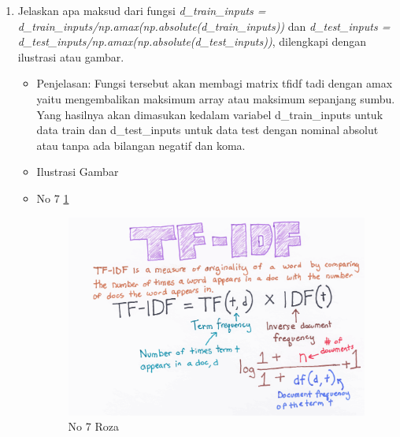 \begin{enumerate}
\item Jelaskan apa maksud dari fungsi \emph{d\_train\_inputs = d\_train\_inputs/np.amax(np.absolute(d\_train\_inputs))} dan \emph{d\_test\_inputs = d\_test\_inputs/np.amax(np.absolute(d\_test\_inputs))}, dilengkapi dengan ilustrasi atau gambar.
\begin{itemize}
\item Penjelasan: Fungsi tersebut akan membagi matrix tfidf tadi dengan amax yaitu mengembalikan maksimum array atau maksimum sepanjang sumbu. Yang hasilnya akan dimasukan kedalam variabel d\_train\_inputs untuk data train dan d\_test\_inputs untuk data test dengan nominal absolut atau tanpa ada bilangan negatif dan koma.
\par 
\par
\item Ilustrasi Gambar
\item No 7 \ref{teori7}
\begin{figure}[!hbtp]
\centering
\includegraphics[scale=0.4]{figures/teori7.png}
\caption{No 7 Roza}
\label{teori7}
\end{figure}
\par
\end{itemize}
\par
\par


\end{enumerate}
